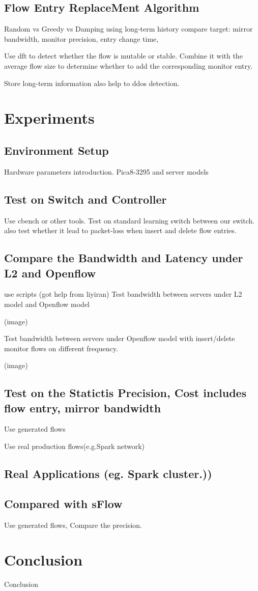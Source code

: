 \documentclass{acm_proc_article-sp}
\begin{document}
\subsection{Flow Entry ReplaceMent Algorithm}

Random vs Greedy vs Damping using long-term history
compare target: mirror bandwidth,  monitor precision, entry change time, 

Use dft to detect whether the flow is mutable or stable. Combine it with the average flow size to determine whether to add the corresponding monitor entry.

Store long-term information also help to ddos detection.


\section{Experiments}

\subsection{Environment Setup}

Hardware parameters introduction. Pica8-3295 and server models

\subsection{Test on Switch and Controller}
Use cbench or other tools. Test on standard learning switch between our switch.
also test whether it lead to packet-loss when insert and delete flow entries.

\subsection{Compare the Bandwidth and Latency under L2 and Openflow}
use scripts (got help from liyiran)
Test bandwidth between servers under L2 model and Openflow model

(image)

Test bandwidth between servers under Openflow model with insert/delete monitor flows on different frequency.

(image)


\subsection{Test on the Statictis Precision, Cost includes flow entry, mirror bandwidth}
Use generated flows

Use real production flows(e.g.Spark network)

\subsection{Real Applications (eg. Spark cluster.))}

\subsection{Compared with sFlow}
Use generated flows, Compare the precision.

\section{Conclusion}

Conclusion




\end{document}
